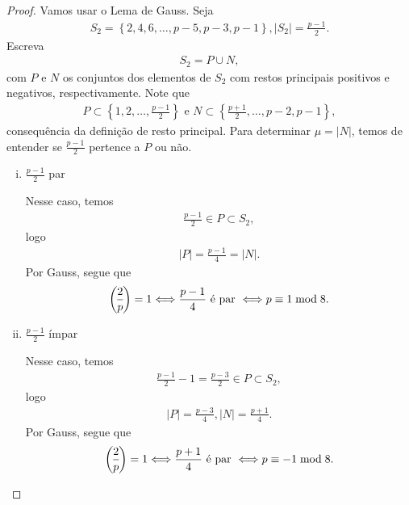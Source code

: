 \documentclass[a4paper,11pt,twoside, leqno]{article}
\newcommand{\genlegendre}[4]{%
	\genfrac{(}{)}{}{#1}{#3}{#4}%
	\if\relax\detokenize{#2}\relax\else_{\!#2}\fi
}
\newcommand{\legendre}[3][]{\genlegendre{}{#1}{#2}{#3}}
\theoremstyle{definition}
\begin{document}
\begin{proof}
	Vamos usar o Lema de Gauss. Seja 
	\begin{align*}
	S_2 = \left\{ 2,4,6,\dots,p-5,p-3,p-1 \right\}, |S_2| = \frac{p-1}{2}.
	\end{align*}
	Escreva 
	\begin{align*}
	S_2 = P\cup N,
	\end{align*}
	com $P$ e $N$ os conjuntos dos elementos de $S_2$ com restos principais positivos e negativos, respectivamente. Note que 
	\begin{align*}
	P\subset \left\{ 1,2,\dots,\frac{p-1}{2} \right\} \text{ e } N\subset\left\{ \frac{p+1}{2}, \dots,p-2,p-1 \right\},
	\end{align*} 
	consequência da definição de resto principal. Para determinar $\mu = |N|$, temos de entender se $\displaystyle{ \frac{p-1}{2} }$ pertence a $P$ ou não.
	\begin{enumerate}[(i)]
		\item $\displaystyle{\frac{p-1}{2}}$ par
		\par Nesse caso, temos
		\begin{align*}
		\frac{p-1}{2}\in P\subset S_2,
		\end{align*}
		logo 
		\begin{align*}
		|P| = \frac{p-1}{4} = |N|.
		\end{align*}
		Por Gauss, segue que
		\begin{align*}
		\legendre[]{2}{p} = 1 \Longleftrightarrow \frac{p-1}{4} \text{ é par } \Longleftrightarrow p\equiv 1\bmod 8.
		\end{align*}
		\item $\displaystyle{\frac{p-1}{2}}$ ímpar
		\par Nesse caso, temos
		\begin{align*}
		\frac{p-1}{2}-1 = \frac{p-3}{2}\in P\subset S_2,
		\end{align*}
		logo 
		\begin{align*}
		|P| = \frac{p-3}{4}, |N| = \frac{p+1}{4}.
		\end{align*}
		Por Gauss, segue que
		\begin{align*}
		\legendre[]{2}{p} = 1 \Longleftrightarrow \frac{p+1}{4} \text{ é par } \Longleftrightarrow p\equiv -1\bmod 8.
		\end{align*}
	\end{enumerate}
\end{proof}
\end{document}
